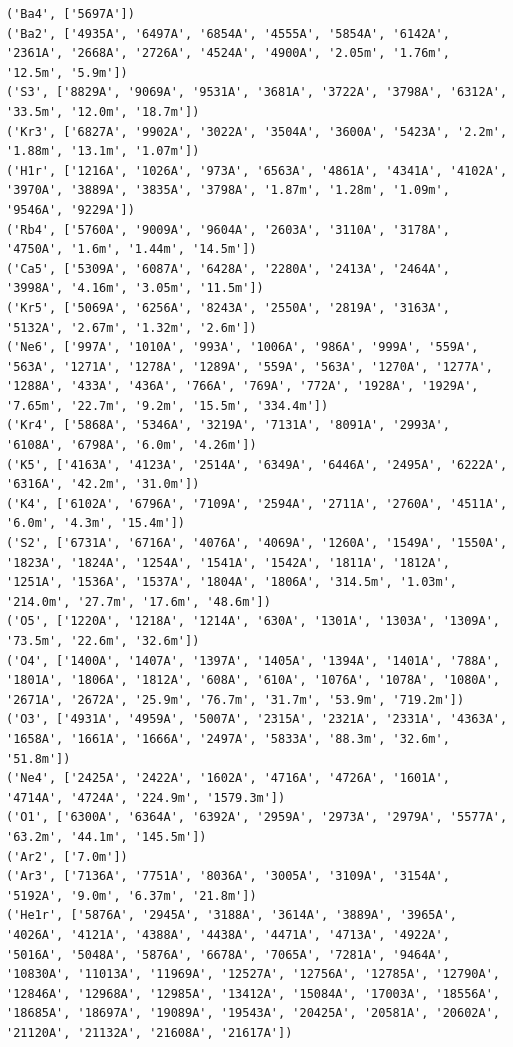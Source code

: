 \documentclass{report}
\begin{document}
    \begin{Verbatim}[commandchars=\\\{\}]
('Ba4', ['5697A'])
('Ba2', ['4935A', '6497A', '6854A', '4555A', '5854A', '6142A', '2361A', '2668A', '2726A', '4524A', '4900A', '2.05m', '1.76m', '12.5m', '5.9m'])
('S3', ['8829A', '9069A', '9531A', '3681A', '3722A', '3798A', '6312A', '33.5m', '12.0m', '18.7m'])
('Kr3', ['6827A', '9902A', '3022A', '3504A', '3600A', '5423A', '2.2m', '1.88m', '13.1m', '1.07m'])
('H1r', ['1216A', '1026A', '973A', '6563A', '4861A', '4341A', '4102A', '3970A', '3889A', '3835A', '3798A', '1.87m', '1.28m', '1.09m', '9546A', '9229A'])
('Rb4', ['5760A', '9009A', '9604A', '2603A', '3110A', '3178A', '4750A', '1.6m', '1.44m', '14.5m'])
('Ca5', ['5309A', '6087A', '6428A', '2280A', '2413A', '2464A', '3998A', '4.16m', '3.05m', '11.5m'])
('Kr5', ['5069A', '6256A', '8243A', '2550A', '2819A', '3163A', '5132A', '2.67m', '1.32m', '2.6m'])
('Ne6', ['997A', '1010A', '993A', '1006A', '986A', '999A', '559A', '563A', '1271A', '1278A', '1289A', '559A', '563A', '1270A', '1277A', '1288A', '433A', '436A', '766A', '769A', '772A', '1928A', '1929A', '7.65m', '22.7m', '9.2m', '15.5m', '334.4m'])
('Kr4', ['5868A', '5346A', '3219A', '7131A', '8091A', '2993A', '6108A', '6798A', '6.0m', '4.26m'])
('K5', ['4163A', '4123A', '2514A', '6349A', '6446A', '2495A', '6222A', '6316A', '42.2m', '31.0m'])
('K4', ['6102A', '6796A', '7109A', '2594A', '2711A', '2760A', '4511A', '6.0m', '4.3m', '15.4m'])
('S2', ['6731A', '6716A', '4076A', '4069A', '1260A', '1549A', '1550A', '1823A', '1824A', '1254A', '1541A', '1542A', '1811A', '1812A', '1251A', '1536A', '1537A', '1804A', '1806A', '314.5m', '1.03m', '214.0m', '27.7m', '17.6m', '48.6m'])
('O5', ['1220A', '1218A', '1214A', '630A', '1301A', '1303A', '1309A', '73.5m', '22.6m', '32.6m'])
('O4', ['1400A', '1407A', '1397A', '1405A', '1394A', '1401A', '788A', '1801A', '1806A', '1812A', '608A', '610A', '1076A', '1078A', '1080A', '2671A', '2672A', '25.9m', '76.7m', '31.7m', '53.9m', '719.2m'])
('O3', ['4931A', '4959A', '5007A', '2315A', '2321A', '2331A', '4363A', '1658A', '1661A', '1666A', '2497A', '5833A', '88.3m', '32.6m', '51.8m'])
('Ne4', ['2425A', '2422A', '1602A', '4716A', '4726A', '1601A', '4714A', '4724A', '224.9m', '1579.3m'])
('O1', ['6300A', '6364A', '6392A', '2959A', '2973A', '2979A', '5577A', '63.2m', '44.1m', '145.5m'])
('Ar2', ['7.0m'])
('Ar3', ['7136A', '7751A', '8036A', '3005A', '3109A', '3154A', '5192A', '9.0m', '6.37m', '21.8m'])
('He1r', ['5876A', '2945A', '3188A', '3614A', '3889A', '3965A', '4026A', '4121A', '4388A', '4438A', '4471A', '4713A', '4922A', '5016A', '5048A', '5876A', '6678A', '7065A', '7281A', '9464A', '10830A', '11013A', '11969A', '12527A', '12756A', '12785A', '12790A', '12846A', '12968A', '12985A', '13412A', '15084A', '17003A', '18556A', '18685A', '18697A', '19089A', '19543A', '20425A', '20581A', '20602A', '21120A', '21132A', '21608A', '21617A'])

\end{Verbatim}
\end{document}
